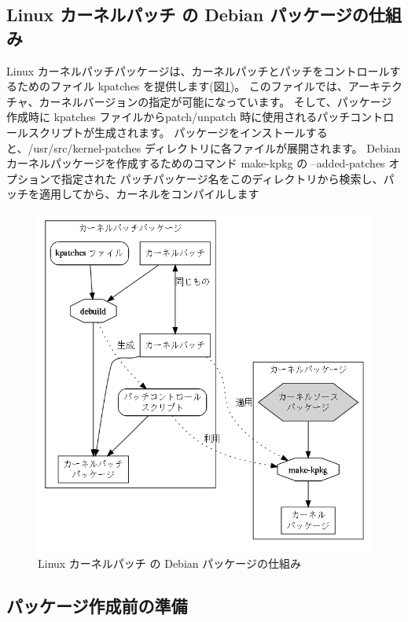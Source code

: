 \documentclass[mingoth,a4paper]{jsarticle}
\begin{document}
\subsection{Linux カーネルパッチ の Debian パッケージの仕組み}
Linux カーネルパッチパッケージは、カーネルパッチとパッチをコントロールするためのファイル kpatches を提供します(図\ref{fig:kpatch0})。
このファイルでは、アーキテクチャ、カーネルバージョンの指定が可能になっています。
そして、パッケージ作成時に kpatches ファイルからpatch/unpatch 時に使用されるパッチコントロールスクリプトが生成されます。
パッケージをインストールすると、/usr/src/kernel-patches ディレクトリに各ファイルが展開されます。
Debian カーネルパッケージを作成するためのコマンド make-kpkg の --added-patches オプションで指定された
パッチパッケージ名をこのディレクトリから検索し、パッチを適用してから、カーネルをコンパイルします
\begin{figure}[h]
 \begin{center}
  \includegraphics[width=0.8\hsize]{image200807/kpatch0.png}
 \end{center}
 \caption{Linux カーネルパッチ の Debian パッケージの仕組み}
 \label{fig:kpatch0}
\end{figure}

\subsection{パッケージ作成前の準備}
\end{document}
